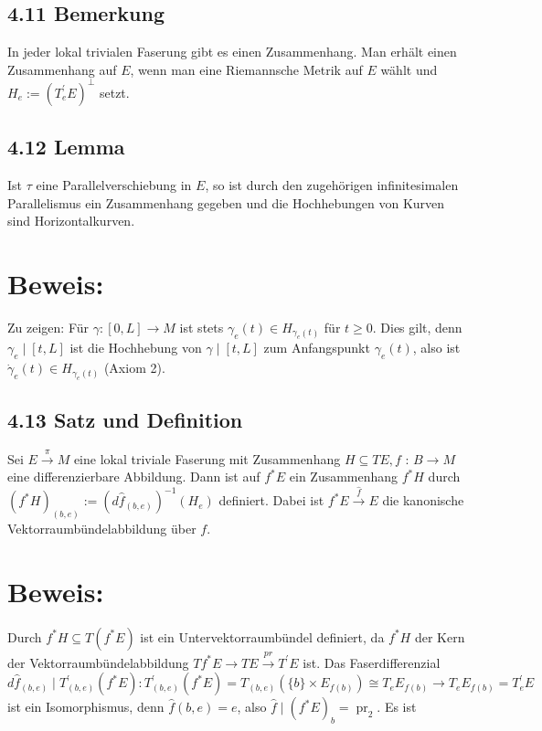 \documentclass[10pt, letterpaper]{article}
\begin{document}
\subsection*{4.11 Bemerkung}
In jeder lokal trivialen Faserung gibt es einen Zusammenhang. Man erhält einen Zusammenhang auf $E$, wenn man eine Riemannsche Metrik auf $E$ wählt und $H_{e}:=\left(T_{e}^{\prime} E\right)^{\perp}$ setzt.

\subsection*{4.12 Lemma}
Ist $\tau$ eine Parallelverschiebung in $E$, so ist durch den zugehörigen infinitesimalen Parallelismus ein Zusammenhang gegeben und die Hochhebungen von Kurven sind Horizontalkurven.

\section*{Beweis:}
Zu zeigen: Für $\gamma:[0, L] \rightarrow M$ ist stets $\gamma_{e}(t) \in H_{\gamma_{e}(t)}$ für $t \geq 0$. Dies gilt, denn $\gamma_{e} \mid[t, L]$ ist die Hochhebung von $\gamma \mid[t, L]$ zum Anfangspunkt $\gamma_{e}(t)$, also ist $\dot{\gamma}_{e}(t) \in H_{\gamma_{e}(t)}$ (Axiom 2).

\subsection*{4.13 Satz und Definition}
Sei $E \xrightarrow{\pi} M$ eine lokal triviale Faserung mit Zusammenhang $H \subseteq T E, f$ : $B \rightarrow M$ eine differenzierbare Abbildung. Dann ist auf $f^{*} E$ ein Zusammenhang $f^{*} H$ durch $\left(f^{*} H\right)_{(b, e)}:=\left(d \hat{f}_{(b, e)}\right)^{-1}\left(H_{e}\right)$ definiert. Dabei ist $f^{*} E \xrightarrow{\hat{f}} E$ die kanonische Vektorraumbündelabbildung über $f$.

\section*{Beweis:}
Durch $f^{*} H \subseteq T\left(f^{*} E\right)$ ist ein Untervektorraumbündel definiert, da $f^{*} H$ der Kern der Vektorraumbündelabbildung $T f^{*} E \rightarrow T E \xrightarrow{p r} T^{\prime} E$ ist. Das Faserdifferenzial\\
$d \hat{f}_{(b, e)} \mid T_{(b, e)}^{\prime}\left(f^{*} E\right): T_{(b, e)}^{\prime}\left(f^{*} E\right)=T_{(b, e)}\left(\{b\} \times E_{f(b)}\right) \cong T_{e} E_{f(b)} \rightarrow T_{e} E_{f(b)}=T_{e}^{\prime} E$\\
ist ein Isomorphismus, denn $\hat{f}(b, e)=e$, also $\hat{f} \mid\left(f^{*} E\right)_{b}=\operatorname{pr}_{2}$. Es ist
\end{document}
